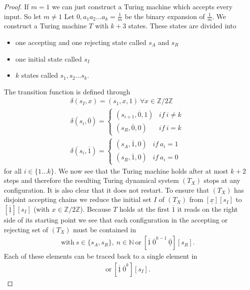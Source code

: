 \documentclass[12pt,a4paper]{scrartcl}
\numberwithin{equation}{section}
\newcommand{\N}{\mathbb{N}} %
\newcommand{\2}{\mathbb{Z} / 2 \mathbb{Z}}
\newcommand{\1}{\overline{1}}
\newcommand{\0}{\overline{0}}
\begin{document}
\begin{proof}
	If $m = 1$ we can just construct a Turing machine which accepts every input. So let $m \neq 1$
	Let $0, a_1 a_2 \ldots a_k = \frac{1}{m}$ be the binary expansion of $\frac{1}{m}$. We construct a Turing machine $T$ with $k+3$ states. These states are divided into
	\begin{itemize}
		\item one accepting and one rejecting state called $s_A$ and $s_R$
		\item one initial state called $s_I$
		\item $k$ states called $s_1, s_2 \ldots s_k$.
	\end{itemize}
	The transition function is defined through 
	\begin{align*}
		\delta(s_I, x) = (s_1, x, 1) \ \forall x \in \2 \\
		\delta(s_i, \overline{0}) = \begin{cases}
			(s_{i+1}, \overline{0}, 1) & if \ i \neq k \\
			(s_R, \overline{0}, 0) & if \ i = k
		\end{cases} \\
		\delta(s_i, \overline{1}) = \begin{cases}
			(s_A, \overline{1}, 0) & if \ a_i = 1 \\
			(s_R, \overline{1}, 0) & if \ a_i = 0
		\end{cases}
	\end{align*}
	for all $i \in \{1 \ldots k\}$.	We now see that the Turing machine holds after at most $k+2$ steps and therefore the resulting Turing dynamical system $(T_X)$ stops at any configuration. It is also clear that it does not restart. To ensure that $(T_X)$ has disjoint accepting chains we reduce the initial set $I$ of $(T_X)$ from $[\underline{x}][s_I]$ to $[\underline{\1}][s_I]$ (with $x \in \2$). Because $T$ holds at the first $\overline{1}$ it reads on the right side of its starting point we see that each configuration in the accepting or rejecting set of $(T_X)$ must be contained in
	\begin{align*}
		[\1 \ \0^n \ \underline{\1}][s] \ \text{with} \ s \in \{s_A, s_R\}, \ n \in \N \ \text{or} \ [\1 \ \0^{k-1} \ \underline{\0}][s_R].
	\end{align*} 
	Each of these elements can be traced back to a single element in
	\begin{align*}
	[\underline{\1} \ \0^{n} \ \1][s_I] \ \text{or} \ [\underline{\1}  \ \0^{k}][s_I].
	\end{align*} 

\end{proof}
\end{document}
